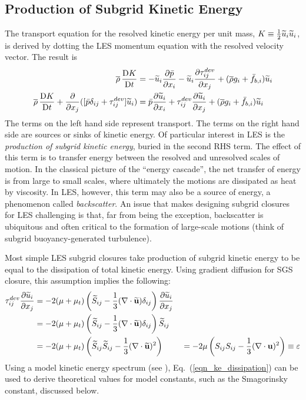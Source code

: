 \subsection{Production of Subgrid Kinetic Energy}

The transport equation for the resolved kinetic energy per unit mass, $K\equiv \mbox{$\frac{1}{2}$} \widetilde{u}_i\widetilde{u}_i$, is derived by dotting the LES momentum equation with the resolved velocity vector.  The result is
\begin{align}
\label{eqn_LES_KE}
\overline{\rho} \,\frac{\mathrm{D} K}{\mathrm{D} t} &= -\widetilde{u}_i\frac{\partial \bar{p}}{\partial x_i} - \widetilde{u}_i\frac{\partial \tau_{ij}^{dev}}{\partial x_j} + (\overline{\rho} g_i + \bar{f}_{b,i}) \widetilde{u}_i \notag \\
\overline{\rho} \,\frac{\mathrm{D} K}{\mathrm{D} t} + \frac{\partial}{\partial x_j} ([\bar{p}\delta_{ij} + \tau_{ij}^{dev}]\widetilde{u}_i) &=  \bar{p} \frac{\partial \widetilde{u}_i}{\partial x_i} + \tau_{ij}^{dev}\frac{\partial \widetilde{u}_i}{\partial x_j} + (\overline{\rho} g_i + \bar{f}_{b,i}) \widetilde{u}_i
\end{align}
The terms on the left hand side represent transport.  The terms on the right hand side are sources or sinks of kinetic energy.  Of particular interest in LES is the \emph{production of subgrid kinetic energy}, buried in the second RHS term.  The effect of this term is to transfer energy between the resolved and unresolved scales of motion.  In the classical picture of the ``energy cascade'', the net transfer of energy is from large to small scales, where ultimately the motions are dissipated as heat by viscosity.  In LES, however, this term may also be a source of energy, a phenomenon called \emph{backscatter}.  An issue that makes designing subgrid closures for LES challenging is that, far from being the exception, backscatter is ubiquitous and often critical to the formation of large-scale motions (think of subgrid buoyancy-generated turbulence).

Most simple LES subgrid closures take production of subgrid kinetic energy to be equal to the dissipation of total kinetic energy.  Using gradient diffusion for SGS closure, this assumption implies the following:
\begin{align}
\label{eqn_ke_dissipation}
\tau_{ij}^{dev}\frac{\partial \widetilde{u}_i}{\partial x_j} &= - 2 (\mu + \mu_t) \left(\widetilde{S}_{ij} - \frac{1}{3}(\nabla\cdot \widetilde{\mathbf{u}}) \delta_{ij} \right) \frac{\partial \widetilde{u}_i}{\partial x_j} && \notag\\
&= - 2 (\mu + \mu_t) \left(\widetilde{S}_{ij} - \frac{1}{3}(\nabla\cdot \widetilde{\mathbf{u}}) \delta_{ij} \right) \widetilde{S}_{ij} && \notag \\
&= - 2 (\mu + \mu_t) \left(\widetilde{S}_{ij}\widetilde{S}_{ij} - \frac{1}{3}(\nabla\cdot \widetilde{\mathbf{u}})^2 \right) && = -2\mu \left(S_{ij}S_{ij} - \frac{1}{3}(\nabla\cdot \mathbf{u})^2 \right) \equiv \varepsilon
\end{align}
Using a model kinetic energy spectrum (see \cite{Pope:2000}), Eq.~(\ref{eqn_ke_dissipation}) can be used to derive theoretical values for model constants, such as the Smagorinsky constant, discussed below.

